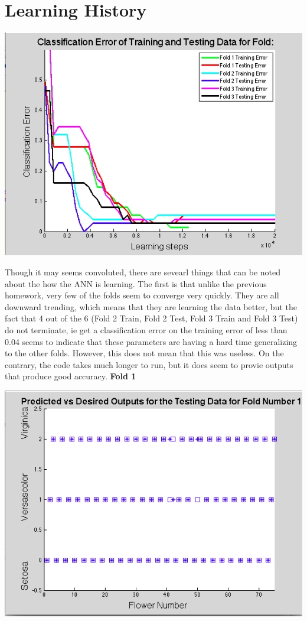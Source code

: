 \documentclass[epsfig]{article}
\begin{document}
\section*{Learning History}
\begin{center}
\includegraphics[scale=0.8]{pic3}
\end{center}
Though it may seems convoluted, there are sevearl things that can be noted about the how the ANN is learning. The first is that unlike the previous homework, very few of the folds seem to converge very quickly. They are all downward trending, which means that they are learning the data better, but the fact that 4 out of the 6 (Fold 2 Train, Fold 2 Test, Fold 3 Train and Fold 3 Test) do not terminate, ie get a classification error on the training error of less than 0.04 seems to indicate that these parameters are having a hard time generalizing to the other folds. However, this does not mean that this was useless. On the contrary, the code takes much longer to run, but it does seem to provie outputs that produce good accuracy.
\newpage
\textbf{Fold 1}
\begin{center}
\includegraphics[scale=0.6]{pic4}
\end{center}
\end{document}
